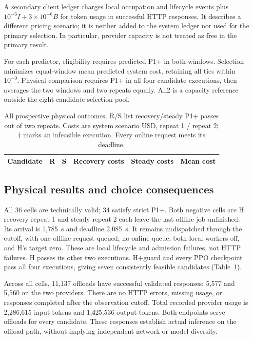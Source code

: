 A secondary client ledger charges local occupation and lifecycle events plus
$10^{-6}I+3\times10^{-6}B$ for token usage in successful HTTP responses.
It describes a different pricing scenario; it is neither added to the system
ledger nor used for the primary selection. In particular, provider capacity
is not treated as free in the primary result.

For each predictor, eligibility requires predicted P1+ in both windows.
Selection minimizes equal-window mean predicted system cost, retaining all
ties within $10^{-9}$. Physical comparison requires P1+ in all four
candidate executions, then averages the two windows and two repeats equally.
All2 is a capacity reference outside the eight-candidate selection pool.

\begin{table}[t]
\centering\small
\caption{All prospective physical outcomes. R/S list recovery/steady P1+
passes out of two repeats. Costs are system scenario USD, repeat 1 / repeat 2;
$\dagger$ marks an infeasible execution. Every online request meets its deadline.}
\label{tab:realapi-all}
\setlength{\tabcolsep}{4pt}
\begin{tabular*}{\textwidth}{@{\extracolsep{\fill}}lccrrr@{}}
\toprule
Candidate & R & S & Recovery costs & Steady costs & Mean cost\\
\midrule

\end{tabular*}
\end{table}

\subsection{Physical results and choice consequences}
All 36 cells are technically valid; 34 satisfy strict P1+. Both negative
cells are H: recovery repeat 1 and steady repeat 2 each leave the last
offline job unfinished. Its arrival is 1,785~s and deadline 2,085~s. It remains
undispatched through the cutoff, with one offline request queued, no online
queue, both local workers off, and H's target zero. These are local lifecycle
and admission failures, not HTTP failures. H passes its other two executions.
H+guard and every PPO checkpoint pass all four executions, giving seven
consistently feasible candidates (Table~\ref{tab:realapi-all}).

Across all cells, 11,137 offloads have successful validated responses:
5,577 and 5,560 on the two providers. There are no HTTP errors, missing usage,
or responses completed after the observation cutoff. Total recorded provider
usage is 2,286,615 input tokens and 1,425,536 output tokens. Both endpoints
serve offloads for every candidate. These responses establish actual inference
on the offload path, without implying independent network or model diversity.

